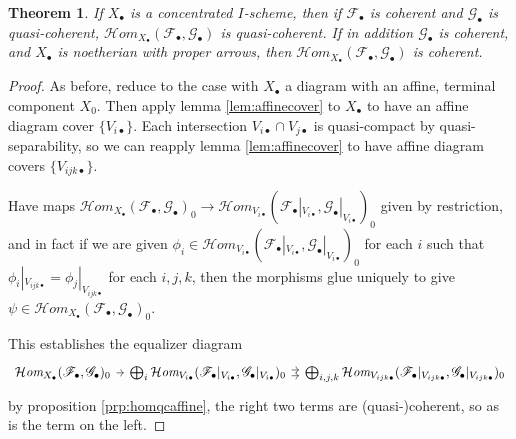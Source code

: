 \documentclass{report}
\newtheorem{theorem}{Theorem}[section]
\theoremstyle{definition}
\newcommand{\cHom}{\mathcal{H} \textit{om}}
\newcommand{\FF}{\mathscr{F}}
\newcommand{\GG}{\mathscr{G}}
\begin{document}
\begin{theorem}
	If $X_\bullet$ is a concentrated $I$-scheme, then if $\FF_\bullet$ is coherent and $\GG_\bullet$ is quasi-coherent, $\cHom_{X_\bullet}(\FF_\bullet, \GG_\bullet)$ is quasi-coherent.
	If in addition $\GG_\bullet$ is coherent, and $X_\bullet$ is noetherian with proper arrows, then $\cHom_{X_\bullet}(\FF_\bullet, \GG_\bullet)$ is coherent.
\end{theorem}
\begin{proof}
	As before, reduce to the case with $X_\bullet$ a diagram with an affine, terminal component $X_0$.
	Then apply lemma \ref{lem:affinecover} to $X_\bullet$ to have an affine diagram cover $\{V_{i\bullet}\}$.
	Each intersection $V_{i \bullet} \cap V_{j \bullet}$ is quasi-compact by quasi-separability, so we can reapply lemma \ref{lem:affinecover} to have affine diagram covers $\{V_{ijk\bullet}\}$.
	
	Have maps $\cHom_{X_\bullet}(\FF_\bullet, \GG_\bullet)_0 \rightarrow \cHom_{V_{i\bullet}}(\FF_\bullet |_{V_{i\bullet}}, \GG_\bullet |_{V_{i \bullet}})_0$ given by restriction, and in fact if we are given $\phi_i \in \cHom_{V_{i\bullet}}(\FF_\bullet |_{V_{i\bullet}}, \GG_\bullet |_{V_{i \bullet}})_0$ for each $i$ such that $\phi_i |_{V_{ijk \bullet}} = \phi_j |_{V_{ijk \bullet}}$ for each $i, j, k$, then the morphisms glue uniquely to give $\psi \in \cHom_{X_\bullet}(\FF_\bullet, \GG_\bullet)_0$.
	
	This establishes the equalizer diagram
	\[
	\begin{tikzcd}[column sep=tiny]
		\cHom_{X_\bullet}(\FF_\bullet, \GG_\bullet)_0 \arrow{r} & \bigoplus_i \cHom_{V_{i\bullet}}(\FF_\bullet |_{V_{i\bullet}}, \GG_\bullet |_{V_{i \bullet}})_0 \arrow[yshift=.5ex]{r} \arrow[yshift=-.5ex]{r} & \bigoplus_{i,j,k} \cHom_{V_{ijk\bullet}}(\FF_\bullet |_{V_{ijk\bullet}}, \GG_\bullet |_{V_{ijk \bullet}})_0
	\end{tikzcd}
	\]
	by proposition \ref{prp:homqcaffine}, the right two terms are (quasi-)coherent, so as is the term on the left.
\end{proof}
\end{document}
